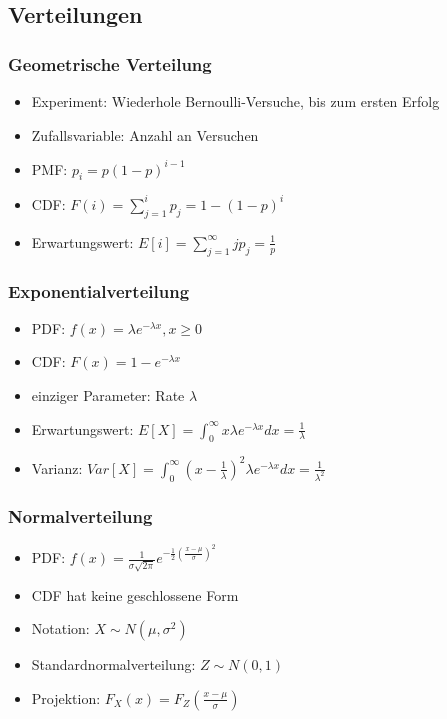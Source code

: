 \documentclass[nonacm=true, language=german]{acmart}
\begin{document}
\subsection{Verteilungen}

\subsubsection{Geometrische Verteilung}

\begin{itemize}
    \item Experiment: Wiederhole Bernoulli-Versuche, bis zum ersten Erfolg
    \item Zufallsvariable: Anzahl an Versuchen
    \item \ac{PMF}: $ p_i = p(1 - p)^{i-1} $
    \item \ac{CDF}: $ \displaystyle F(i) = \sum_{j=1}^i p_j = 1 - (1 - p)^i $
    \item Erwartungswert: $ \displaystyle E[i] = \sum_{j=1}^\infty j p_j = \frac{1}{p} $
\end{itemize}

\subsubsection{Exponentialverteilung}

\begin{itemize}
    \item \ac{PDF}: $ f(x) = \lambda e^{-\lambda x}, x \geq 0 $
    \item \ac{CDF}: $ F(x) = 1 - e^{-\lambda x} $
    \item einziger Parameter: Rate $\lambda$
    \item Erwartungswert: $ \displaystyle E[X] = \int_{0}^\infty x \lambda e^{-\lambda x} dx = \frac{1}{\lambda} $
    \item Varianz: $ \displaystyle Var[X] = \int_{0}^\infty (x - \frac{1}{\lambda})^2 \lambda e^{-\lambda x} dx = \frac{1}{\lambda^2} $
\end{itemize}

\subsubsection{Normalverteilung}

\begin{itemize}
    \item \ac{PDF}: $ f(x) = \frac{1}{\sigma \sqrt{2 \pi}} e^{-\frac{1}{2} (\frac{x - \mu}{\sigma})^2} $
    \item \ac{CDF} hat keine geschlossene Form
    \item Notation: $ X \sim N(\mu, \sigma^2) $
    \item Standardnormalverteilung: $ Z \sim N(0, 1) $
    \item Projektion: $ F_X(x) = F_Z(\frac{x - \mu}{\sigma}) $
\end{itemize}
\end{document}
